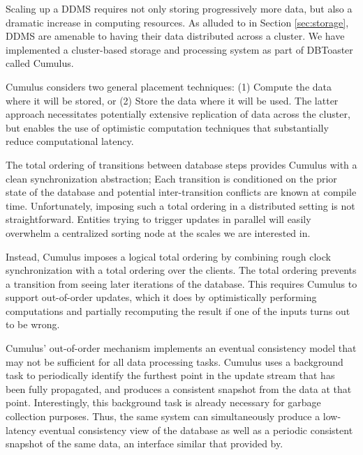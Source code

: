Scaling up a DDMS requires not only storing progressively more data, but also a dramatic increase in computing resources.  As alluded to in Section \ref{sec:storage}, DDMS are amenable to having their data distributed across a cluster.  We have implemented a cluster-based storage and processing system as part of DBToaster called Cumulus.


Cumulus considers two general placement techniques: (1) Compute the data where it will be stored, or (2) Store the data where it will be used.  The latter approach necessitates potentially extensive replication of data across the cluster, but enables the use of optimistic computation techniques that substantially reduce computational latency.

The total ordering of transitions between database steps provides Cumulus with a clean synchronization abstraction; Each transition is conditioned on the prior state of the database and potential inter-transition conflicts are known at compile time.  Unfortunately, imposing such a total ordering in a distributed setting is not straightforward.  Entities trying to trigger updates in parallel will easily overwhelm a centralized sorting node at the scales we are interested in.  

Instead, Cumulus imposes a logical total ordering by combining rough clock synchronization with a total ordering over the clients.  The total ordering prevents a transition from seeing later iterations of the database.  This requires Cumulus to support out-of-order updates, which it does by optimistically performing computations and partially recomputing the result if one of the inputs turns out to be wrong.

Cumulus' out-of-order mechanism implements an eventual consistency model that may not be sufficient for all data processing tasks.  Cumulus uses a background task to periodically identify the furthest point in the update stream that has been fully propagated, and produces a consistent snapshot from the data at that point.  Interestingly, this background task is already necessary for garbage collection purposes.  Thus, the same system can simultaneously produce a low-latency eventual consistency view of the database as well as a periodic consistent snapshot of the same data, an interface similar that provided by\cite{bayou}.